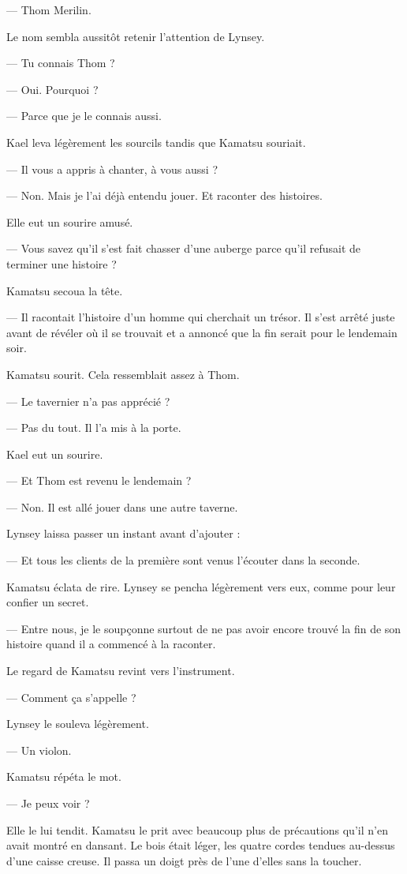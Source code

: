 — Thom Merilin.

Le nom sembla aussitôt retenir l'attention de Lynsey.

— Tu connais Thom ?

— Oui. Pourquoi ?

— Parce que je le connais aussi.

Kael leva légèrement les sourcils tandis que Kamatsu souriait.

— Il vous a appris à chanter, à vous aussi ?

— Non. Mais je l'ai déjà entendu jouer. Et raconter des histoires.

Elle eut un sourire amusé.

— Vous savez qu'il s'est fait chasser d'une auberge parce qu'il refusait de
terminer une histoire ?

Kamatsu secoua la tête.

— Il racontait l'histoire d'un homme qui cherchait un trésor. Il s'est arrêté
juste avant de révéler où il se trouvait et a annoncé que la fin serait pour
le lendemain soir.

Kamatsu sourit. Cela ressemblait assez à Thom.

— Le tavernier n'a pas apprécié ?

— Pas du tout. Il l'a mis à la porte.

Kael eut un sourire.

— Et Thom est revenu le lendemain ?

— Non. Il est allé jouer dans une autre taverne.

Lynsey laissa passer un instant avant d'ajouter :

— Et tous les clients de la première sont venus l'écouter dans la seconde.

Kamatsu éclata de rire. Lynsey se pencha légèrement vers eux, comme pour leur
confier un secret.

— Entre nous, je le soupçonne surtout de ne pas avoir encore trouvé la fin de
son histoire quand il a commencé à la raconter.

Le regard de Kamatsu revint vers l'instrument.

— Comment ça s'appelle ?

Lynsey le souleva légèrement.

— Un violon.

Kamatsu répéta le mot.

— Je peux voir ?

Elle le lui tendit. Kamatsu le prit avec beaucoup plus de précautions qu'il
n'en avait montré en dansant. Le bois était léger, les quatre cordes tendues
au-dessus d'une caisse creuse. Il passa un doigt près de l'une d'elles sans la
toucher.

